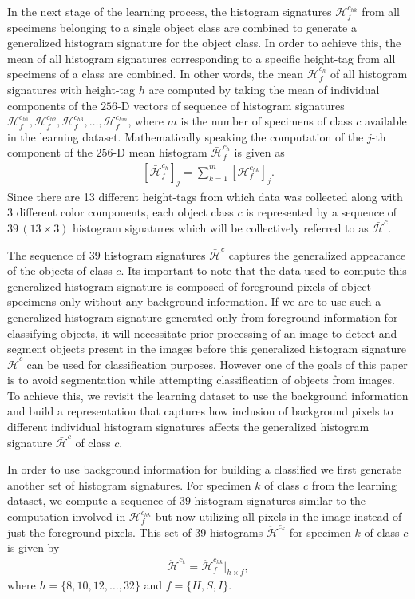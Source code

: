 \documentclass {udthesis}
\begin{document}
In the next stage of the learning process, the histogram signatures $\mathcal{H}^{c_{hk}}_f$ from all specimens belonging to a single object class are combined to generate a generalized histogram signature for the object class.
In order to achieve this, the mean of all histogram signatures corresponding to a specific height-tag from all specimens of a class are combined. In other words, the mean $\bar{\mathcal{H}}^{c_{h}}_f$ of all histogram signatures with  height-tag $h$ are computed by taking the mean of individual components of the $256$-D vectors of sequence of histogram signatures $\mathcal{H}^{c_{h1}}_f, \mathcal{H}^{c_{h2}}_f, \mathcal{H}^{c_{h3}}_f, \ldots, \mathcal{H}^{c_{hm}}_f$, where $m$ is the number of specimens of class $c$ available in the learning dataset. Mathematically speaking the computation of the $j$-th component of the $256$-D mean histogram $\bar{\mathcal{H}}^{c_{h}}_f$ is given as
\begin{align}
 \left[\bar{\mathcal{H}}^{c_{h}}_f\right]_j=\sum_{k=1}^{m} \left[ \mathcal{H}^{c_{hk}}_f \right]_j.
\end{align}
Since there are 13 different height-tags from which data was collected along with 3 different color components, each object class $c$ is represented by a sequence of $39\, (13 \times 3)$ histogram signatures which will be collectively referred to as $\bar{\mathcal{H}}^{c}$.

The sequence of $39$ histogram signatures $\bar{\mathcal{H}}^{c}$ captures the generalized appearance of the objects of class $c$. Its important to note that the data used to compute this generalized histogram signature is composed of foreground pixels of object specimens only without any background information. If we are to use such a generalized histogram signature generated only from foreground information for classifying objects, it will necessitate prior processing of an image to detect and segment objects present in the images before this generalized histogram signature $\bar{\mathcal{H}}^{c}$ can be used for classification purposes. However one of the goals of this paper is to avoid segmentation while attempting classification of objects from images. To achieve this, we revisit the learning dataset to use the background information and build a representation that captures how inclusion of background pixels to different individual histogram signatures affects the generalized histogram signature $\bar{\mathcal{H}}^{c}$ of class $c$. 

In order to use background information for building a classified we first generate another set of histogram signatures.
For specimen $k$ of class $c$ from the learning dataset, we compute a sequence of $39$ histogram signatures similar to the computation involved in $\mathcal{H}^{c_{hk}}_f$ but now utilizing all pixels in the image instead of just the foreground pixels. This set of 39 histograms $\ddot{\mathcal{H}}^{c_{k}}$ for specimen $k$ of class $c$ is given by
\begin{align}	\label{eqn:hist_signature}
 \ddot{\mathcal{H}}^{c_{k}} = \ddot{\mathcal{H}}^{c_{hk}}_f \Big|_{h\times f},
\end{align}
%
where $h=\{8,10,12, \ldots,32\}$ and $f=\{H,S,I\}$.
\end{document}
